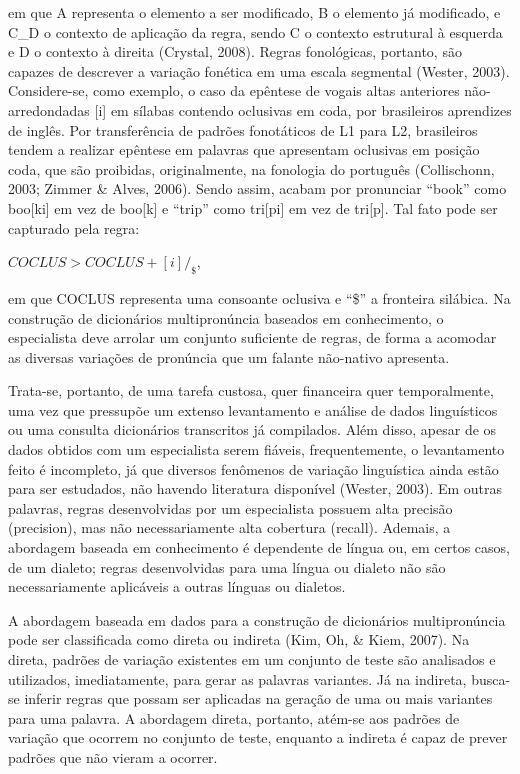 em que A representa o elemento a ser modificado, B o elemento j\'a
modificado, e C\_D o contexto de aplica\c{c}\~ao da regra, sendo C o contexto
estrutural à esquerda e D o contexto à direita (Crystal, 2008). Regras
fonol\'ogicas, portanto, s\~ao capazes de descrever a varia\c{c}\~ao fon\'etica em
uma escala segmental (Wester, 2003). Considere-se, como exemplo, o caso
da ep\^entese de vogais altas anteriores n\~ao-arredondadas {[}i{]} em
s\'ilabas contendo oclusivas em coda, por brasileiros aprendizes de
ingl\^es. Por transfer\^encia de padr\~oes fonot\'aticos de L1 para L2,
brasileiros tendem a realizar ep\^entese em palavras que apresentam
oclusivas em posi\c{c}\~ao coda, que s\~ao proibidas, originalmente, na
fonologia do portugu\^es (Collischonn, 2003; Zimmer \& Alves, 2006). Sendo
assim, acabam por pronunciar ``book'' como boo{[}ki{]} em vez de
boo{[}k{]} e ``trip'' como tri{[}pi{]} em vez de tri{[}p{]}. Tal fato
pode ser capturado pela regra:

                      $COCLUS > COCLUS+[i] / _\$$,

em que COCLUS representa uma consoante oclusiva e ``\$'' a fronteira
sil\'abica. Na constru\c{c}\~ao de dicion\'arios multipron\'uncia baseados em
conhecimento, o especialista deve arrolar um conjunto suficiente de
regras, de forma a acomodar as diversas varia\c{c}\~oes de pron\'uncia que um
falante n\~ao-nativo apresenta.

Trata-se, portanto,  de  uma  tarefa  custosa,  quer  financeira  quer
temporalmente, uma vez que pressup\~oe um extenso levantamento e an\'alise
de dados lingu\'isticos ou uma consulta dicion\'arios transcritos j\'a
compilados. Al\'em disso, apesar de os dados obtidos com um especialista
serem fi\'aveis, frequentemente, o levantamento feito \'e incompleto, j\'a que
diversos fen\^omenos de varia\c{c}\~ao lingu\'istica ainda est\~ao para ser
estudados, n\~ao havendo literatura dispon\'ivel (Wester, 2003). Em outras
palavras, regras desenvolvidas por um especialista possuem alta precis\~ao
(precision), mas n\~ao necessariamente alta cobertura (recall). Ademais, a
abordagem baseada em conhecimento \'e dependente de l\'ingua ou, em certos
casos, de um dialeto; regras desenvolvidas para uma l\'ingua ou dialeto
n\~ao s\~ao necessariamente aplic\'aveis a outras l\'inguas ou dialetos.

A abordagem baseada em dados para a constru\c{c}\~ao de dicion\'arios
multipron\'uncia pode ser classificada como direta ou indireta (Kim, Oh,
\& Kiem, 2007). Na direta, padr\~oes de varia\c{c}\~ao existentes em um conjunto
de teste s\~ao analisados e utilizados, imediatamente, para gerar as
palavras variantes. J\'a na indireta, busca-se inferir regras que possam
ser aplicadas na gera\c{c}\~ao de uma ou mais variantes para uma palavra. A
abordagem direta, portanto, at\'em-se aos padr\~oes de varia\c{c}\~ao que ocorrem
no conjunto de teste, enquanto a indireta \'e capaz de prever padr\~oes que
n\~ao vieram a ocorrer.

